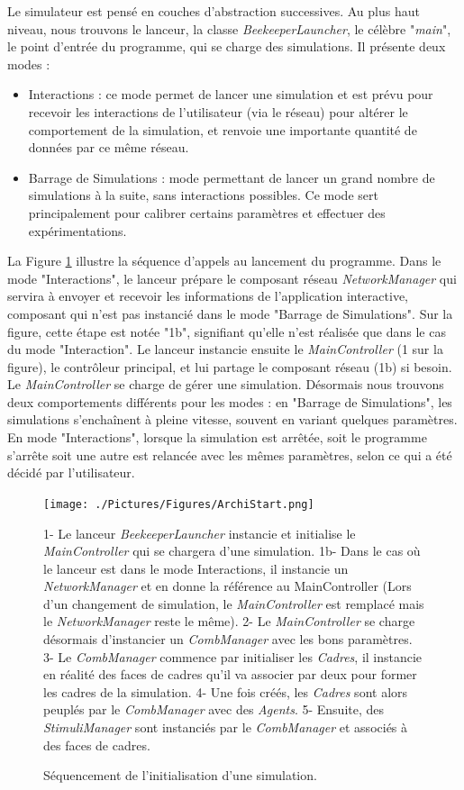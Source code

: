 			Le simulateur est pensé en couches d'abstraction successives. Au plus haut niveau, nous trouvons le lanceur, la classe \textit{BeekeeperLauncher}, le célèbre "\textit{main}", le point d'entrée du programme, qui se charge des simulations. Il présente deux modes :
	\begin{itemize}
		\item Interactions : ce mode permet de lancer une simulation et est prévu pour recevoir les interactions de l'utilisateur (via le réseau) pour altérer le comportement de la simulation, et renvoie une importante quantité de données par ce même réseau.
		\item Barrage de Simulations : mode permettant de lancer un grand nombre de simulations à la suite, sans interactions possibles. Ce mode sert principalement pour calibrer certains paramètres et effectuer des expérimentations.
	\end{itemize}				
			
			 La Figure \ref{ArchiStart} illustre la séquence d'appels au lancement du programme. Dans le mode "Interactions", le lanceur prépare le composant réseau \textit{NetworkManager} qui servira à envoyer et recevoir les informations de l'application interactive, composant qui n'est pas instancié dans le mode "Barrage de Simulations". Sur la figure, cette étape est notée "1b", signifiant qu'elle n'est réalisée que dans le cas du mode "Interaction". Le lanceur instancie ensuite le \textit{MainController} (1 sur la figure), le contrôleur principal, et lui partage le composant réseau (1b) si besoin. Le \textit{MainController} se charge de gérer une simulation. Désormais nous trouvons deux comportements différents pour les modes : en "Barrage de Simulations", les simulations s'enchaînent à pleine vitesse, souvent en variant quelques paramètres. En mode "Interactions", lorsque la simulation est arrêtée, soit le programme s'arrête soit une autre est relancée avec les mêmes paramètres, selon ce qui a été décidé par l'utilisateur.
			 
			\begin{figure}
			\centering
			\texttt{[image: ./Pictures/Figures/ArchiStart.png]}
			\caption{Séquencement de l'initialisation d'une simulation.}{1- Le lanceur \textit{BeekeeperLauncher} instancie et initialise le \textit{MainController} qui se chargera d'une simulation. 1b- Dans le cas où le lanceur est dans le mode Interactions, il instancie un \textit{NetworkManager} et en donne la référence au MainController (Lors d'un changement de simulation, le \textit{MainController} est remplacé mais le \textit{NetworkManager} reste le même). 2- Le \textit{MainController} se charge désormais d'instancier un \textit{CombManager} avec les bons paramètres. 3- Le \textit{CombManager} commence par initialiser les \textit{Cadres}, il instancie en réalité des faces de cadres qu'il va associer par deux pour former les cadres de la simulation. 4- Une fois créés, les \textit{Cadres} sont alors peuplés par le \textit{CombManager} avec des \textit{Agents}. 5- Ensuite, des \textit{StimuliManager} sont instanciés par le \textit{CombManager} et associés à des faces de cadres.}
			\label{ArchiStart}
			\end{figure}
			
